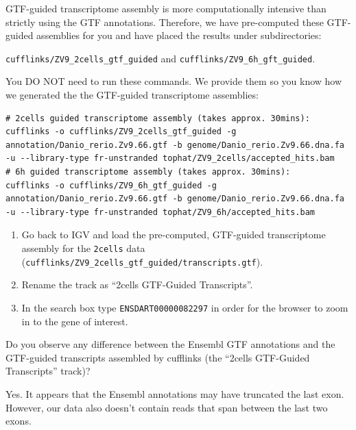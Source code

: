 \begin{warning}
GTF-guided transcriptome assembly is more computationally intensive than
strictly using the GTF annotations. Therefore, we have pre-computed these
GTF-guided assemblies for you and have placed the results under subdirectories:

\texttt{cufflinks/ZV9\_2cells\_gtf\_guided} and
\texttt{cufflinks/ZV9\_6h\_gft\_guided}.

You DO NOT need to run these commands. We provide them so you know how we
generated the the GTF-guided transcriptome assemblies:
\begin{lstlisting}
# 2cells guided transcriptome assembly (takes approx. 30mins):
cufflinks -o cufflinks/ZV9_2cells_gtf_guided -g annotation/Danio_rerio.Zv9.66.gtf -b genome/Danio_rerio.Zv9.66.dna.fa -u --library-type fr-unstranded tophat/ZV9_2cells/accepted_hits.bam
# 6h guided transcriptome assembly (takes approx. 30mins):
cufflinks -o cufflinks/ZV9_6h_gtf_guided -g annotation/Danio_rerio.Zv9.66.gtf -b genome/Danio_rerio.Zv9.66.dna.fa -u --library-type fr-unstranded tophat/ZV9_6h/accepted_hits.bam
\end{lstlisting}

\end{warning}

\begin{steps}
\begin{enumerate}
  \item Go back to IGV and load the pre-computed, GTF-guided transcriptome
  assembly for the \texttt{2cells} data
  (\texttt{cufflinks/ZV9\_2cells\_gtf\_guided/transcripts.gtf}).
  \item Rename the track as ``2cells GTF-Guided Transcripts''.
  \item In the search box type \texttt{ENSDART00000082297} in order for the
  browser to zoom in to the gene of interest.
\end{enumerate}
\end{steps}

\begin{questions}
Do you observe any difference between the Ensembl GTF annotations and the
GTF-guided transcripts assembled by cufflinks (the ``2cells GTF-Guided Transcripts'' track)?
\begin{answer}
Yes. It appears that the Ensembl annotations may have truncated the last exon.
However, our data also doesn't contain reads that span between the last two
exons.
\end{answer}

\end{questions}

